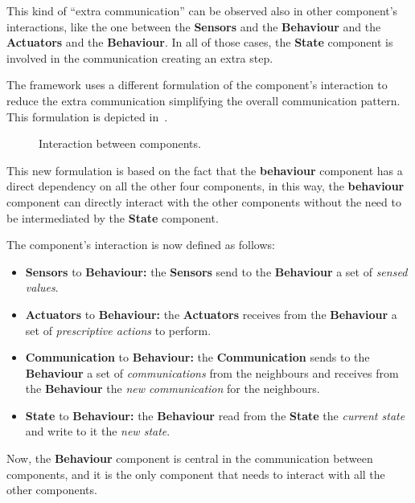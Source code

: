 This kind of ``extra communication'' can be observed also in other component's interactions, like the one between the \textbf{Sensors} and the
\textbf{Behaviour} and the \textbf{Actuators} and the \textbf{Behaviour}. In all of those cases, the \textbf{State} component is involved in the
communication creating an extra step.

The framework uses a different formulation of the component's interaction to reduce the extra communication simplifying the overall communication
pattern. This formulation is depicted in~.

\begin{figure}
	\centering
	\caption{Interaction between components.}
	\label{fig:framework-components-interaction-2}
\end{figure}

This new formulation is based on the fact that the \textbf{behaviour} component has a direct dependency on all the other four components,
in this way, the \textbf{behaviour} component can directly interact with the other components without the need to be intermediated by the
\textbf{State} component.

The component's interaction is now defined as follows:
\begin{itemize}
	\item \textbf{Sensors} to \textbf{Behaviour:} the \textbf{Sensors} send to the \textbf{Behaviour} a set of \textit{sensed values}.
	\item \textbf{Actuators} to \textbf{Behaviour:} the \textbf{Actuators} receives from the \textbf{Behaviour} a set of \textit{prescriptive
		      actions} to perform.
	\item \textbf{Communication} to \textbf{Behaviour:} the \textbf{Communication} sends to the \textbf{Behaviour} a set of \textit{communications}
	      from the neighbours and receives from the \textbf{Behaviour} the \textit{new communication} for the neighbours.
	      \item\textbf{State} to \textbf{Behaviour:} the \textbf{Behaviour} read from the \textbf{State} the \textit{current state} and write to it
	      the \textit{new state}.
\end{itemize}

Now, the \textbf{Behaviour} component is central in the communication between components, and it is the only component that needs to interact with all the other components.

